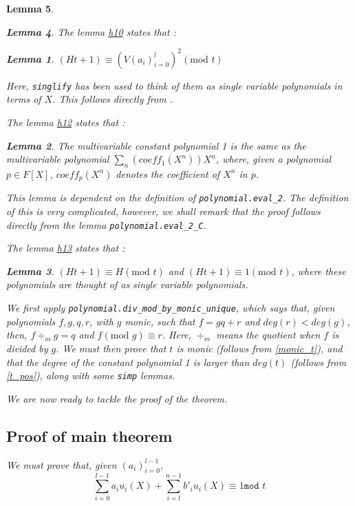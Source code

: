 \documentclass{article}
\newtheorem{lemma}{Lemma}
\theoremstyle{definition}
\theoremstyle{remark}
\begin{document}
\begin{lemma}
\begin{lemma}
The lemma \href{https://github.com/BoltonBailey/formal-snarks-project/blob/7fd9cd122f5887f88f6a706b4f2a68a7153c7381/src/snarks/babysnark/knowledge_soundness.lean#L438}{h10} states that :
\theoremstyle{lemma}
\begin{lemma} \label{h10}
  $ (Ht + 1) \equiv (V (a_i)_{i = 0}^{l})^2 (\text{mod }t) $
\end{lemma}
Here, \texttt{singlify} has been used to think of them as single variable polynomials in terms of $X$. This follows directly from .

The lemma \href{https://github.com/BoltonBailey/formal-snarks-project/blob/7fd9cd122f5887f88f6a706b4f2a68a7153c7381/src/snarks/babysnark/knowledge_soundness.lean#L449}{h12} states that :
\theoremstyle{lemma}
\begin{lemma} \label{h12}
  The multivariable constant polynomial 1 is the same as the multivariable polynomial $\sum_{n} (coeff_{1} (X^n)) X^n$, where, given a polynomial $p \in F[X]$, $coeff_{p} (X^n)$ denotes 
  the coefficient of $X^n$ in $p$.
\end{lemma}
This lemma is dependent on the definition of \texttt{polynomial.eval\_2}. The definition of this is very complicated, however, we shall remark that the proof follows directly from the lemma 
\texttt{polynomial.eval\_2\_C}.

The lemma \href{https://github.com/BoltonBailey/formal-snarks-project/blob/7fd9cd122f5887f88f6a706b4f2a68a7153c7381/src/snarks/babysnark/knowledge_soundness.lean#L454}{h13} states that :
\theoremstyle{lemma}
\begin{lemma} \label{h13}
  $ (Ht + 1) \equiv H (\text{mod }t) $ and $ (Ht + 1) \equiv 1 (\text{mod }t) $, where these polynomials are thought of as single variable polynomials.
\end{lemma}
We first apply \texttt{polynomial.div\_mod\_by\_monic\_unique}, which says that, given polynomials $f, g, q, r$, with $g$ monic, such that $f = g q + r$ and $deg(r) < deg (g)$, then,
$f \div_m g = q$ and $f (\text{mod }g) \equiv r$. Here, $\div_m$ means the quotient when $f$ is divided by $g$. We must then prove that $t$ is monic (follows from \ref{monic_t}), and 
that the degree of the constant polynomial 1 is larger than $deg(t)$ (follows from \ref{t_pos}), along with some \texttt{simp} lemmas.

We are now ready to tackle the proof of the theorem.

\subsection{Proof of main theorem}
We must prove that, given $(a_i)_{i = 0}^{l - 1}$,
$$ \sum_{i = 0}^{l - 1} a_i u_i(X) + \sum_{i = l}^{n - 1} b'_i u_i (X) \equiv 1 \texttt{mod } t $$


\end{lemma}
\end{lemma}
\end{document}
